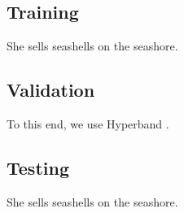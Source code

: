 \subsection{Training}
She sells seashells on the seashore.

\subsection{Validation}
To this end, we use Hyperband \cite{li2016}.

\subsection{Testing}
She sells seashells on the seashore.
